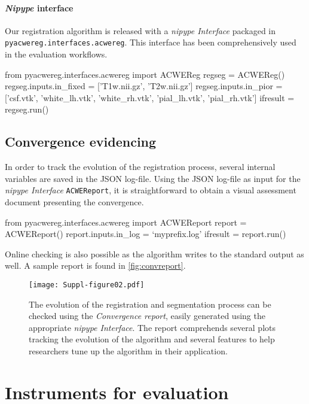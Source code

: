 \documentclass[a4paper]{report}
\newcommand*{\codeinline}[1]{\colorbox{listingbg}{\lstinline!#1!}}
\begin{document}
\paragraph{\emph{Nipype} interface}
Our registration algorithm is released with a \emph{nipype Interface} packaged in
  \codeinline{pyacwereg.interfaces.acwereg}.
This interface has been comprehensively used in the evaluation workflows.

\begin{pythoncode}
from pyacwereg.interfaces.acwereg import ACWEReg
regseg = ACWEReg()
regseg.inputs.in_fixed = ['T1w.nii.gz', 'T2w.nii.gz']
regseg.inputs.in_pior = ['csf.vtk', 'white_lh.vtk', 'white_rh.vtk',
                         'pial_lh.vtk', 'pial_rh.vtk']
ifresult = regseg.run()
\end{pythoncode}


\subsection{Convergence evidencing}\label{sec:convergence_evidence}

In order to track the evolution of the registration process, several internal variables
  are saved in the JSON log-file.
Using the JSON log-file as input for the \emph{nipype Interface}
  \codeinline{ACWEReport}, it is straightforward to obtain
  a visual assessment document presenting the convergence.
\begin{pythoncode}
from pyacwereg.interfaces.acwereg import ACWEReport
report = ACWEReport()
report.inputs.in_log = `myprefix.log'
ifresult = report.run()
\end{pythoncode}

Online checking is also possible as the algorithm writes to the standard output as well.
A sample report is found in \autoref{fig:convreport}.

\begin{figure}[b]
  \texttt{[image: Suppl-figure02.pdf]}
  \caption{The evolution of the registration and segmentation process can be
    checked using the \emph{Convergence report},
    easily generated using the appropriate \emph{nipype Interface}.
  The report comprehends several plots tracking the evolution of the algorithm and several
    features to help researchers tune up the algorithm in their application.}%
    \label{fig:convreport}
\end{figure}

\clearpage
\section{Instruments for evaluation}
\end{document}
